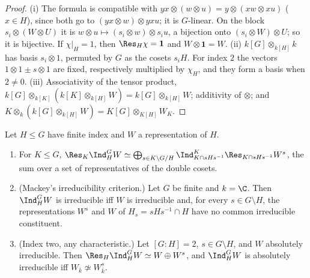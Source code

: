 \begin{proof}
(i) The formula is compatible with $yx\otimes(w\otimes u)=y\otimes(xw\otimes xu)$ ($x\in H$), since both go to $(yx\otimes w)\otimes yxu$; it is $G$-linear.
On the block $s_i\otimes(W\otimes U)$ it is $w\otimes u\mapsto(s_i\otimes w)\otimes s_iu$, a bijection onto $(s_i\otimes W)\otimes U$; so it is bijective. If
$\chi|_H=1$, then $\Res_H\chi=\mathbf1$ and $W\otimes\mathbf1=W$.
(ii) $k[G]\otimes_{k[H]}k$ has basis $s_i\otimes1$, permuted by $G$ as the cosets $s_iH$. For index $2$ the vectors $1\otimes1\pm s\otimes1$ are fixed,
respectively multiplied by $\chi_H$, and they form a basis when $2\ne0$.
(iii) Associativity of the tensor product, $k[G]\otimes_{k[K]}(k[K]\otimes_{k[H]}W)=k[G]\otimes_{k[H]}W$; additivity of $\otimes$; and $K\otimes_k(k[G]\otimes_{k[H]}W)=
K[G]\otimes_{K[H]}W_K$.
\end{proof}

\begin{theorem}[Mackey]\label{thm:reps:mackey}
Let $H\le G$ have finite index and $W$ a representation of $H$.
\begin{enumerate}[label=(\alph*)]
\item For $K\le G$, $\Res_K\Ind_H^GW\simeq\bigoplus_{s\in K\backslash G/H}\Ind^K_{K\cap sHs^{-1}}\Res_{K\cap sHs^{-1}}W^s$, the sum over a set of representatives of the
double cosets.
\item (Mackey's irreducibility criterion.) Let $G$ be finite and $k=\C$. Then $\Ind_H^GW$ is irreducible iff $W$ is
irreducible and, for every $s\in G\setminus H$, the representations $W^s$ and $W$ of $H_s=sHs^{-1}\cap H$ have no common irreducible
constituent.
\item (Index two, any characteristic.) Let $[G:H]=2$, $s\in G\setminus H$, and $W$ absolutely irreducible. Then $\Res_H\Ind_H^GW\simeq W\oplus W^s$, and
$\Ind_H^GW$ is absolutely irreducible iff $W_{\bar k}\not\simeq W^s_{\bar k}$.
\end{enumerate}
\end{theorem}


